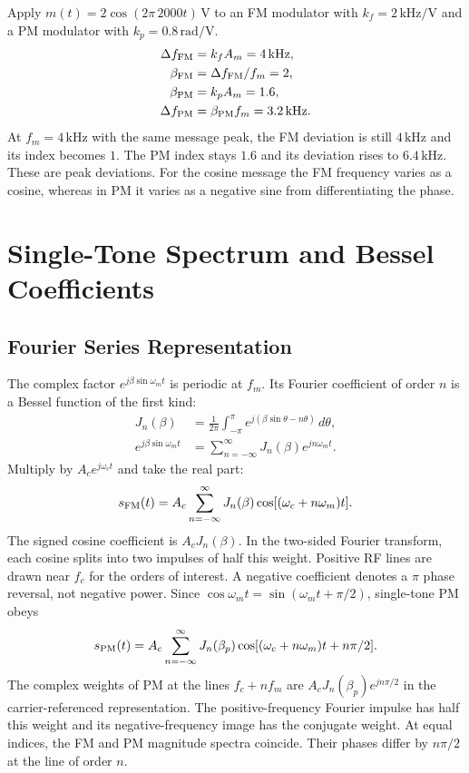 \documentclass[12pt,a4paper]{article}
\begin{document}
\begin{tcolorbox}[examplebox, title={Compare FM and PM When the Message Frequency Doubles}]
Apply $m(t)=2\cos(2\pi\,2000t)\,\mathrm V$ to an FM modulator with $k_f=2\,\mathrm{kHz/V}$ and a PM modulator with $k_p=0.8\,\mathrm{rad/V}$.
\[
\begin{aligned}
 \Delta f_{\rm FM} &= k_f A_m=4\,\mathrm{kHz},\\
 \beta_{\rm FM}&=\Delta f_{\rm FM}/f_m=2,\\
 \beta_{\rm PM}&=k_pA_m=1.6,\\
 \Delta f_{\rm PM} &=\beta_{\rm PM}f_m=3.2\,\mathrm{kHz}.
\end{aligned}
\]
At $f_m=4\,\mathrm{kHz}$ with the same message peak, the FM deviation is still $4\,\mathrm{kHz}$ and its index becomes $1$. The PM index stays $1.6$ and its deviation rises to $6.4\,\mathrm{kHz}$. These are peak deviations. For the cosine message the FM frequency varies as a cosine, whereas in PM it varies as a negative sine from differentiating the phase.
\end{tcolorbox}

\section{Single-Tone Spectrum and Bessel Coefficients}
\subsection{Fourier Series Representation}
The complex factor $e^{j\beta\sin\omega_mt}$ is periodic at $f_m$. Its Fourier coefficient of order $n$ is a Bessel function of the first kind:
\[
\begin{aligned}
 J_n(\beta)&=\frac{1}{2\pi}\int_{-\pi}^{\pi}
            e^{j(\beta\sin\theta-n\theta)}\,d\theta,\\
 e^{j\beta\sin\omega_mt}&=\sum_{n=-\infty}^{\infty}
            J_n(\beta)e^{jn\omega_mt}.
\end{aligned}
\]
Multiply by $A_ce^{j\omega_ct}$ and take the real part:
\[
 s_{\rm FM}(t)=A_c\sum_{n=-\infty}^{\infty}
          J_n(\beta)\cos[(\omega_c+n\omega_m)t].
\]
The signed cosine coefficient is $A_cJ_n(\beta)$. In the two-sided Fourier transform, each cosine splits into two impulses of half this weight. Positive RF lines are drawn near $f_c$ for the orders of interest. A negative coefficient denotes a $\pi$ phase reversal, not negative power. Since $\cos\omega_mt=\sin(\omega_mt+\pi/2)$, single-tone PM obeys
\[
 s_{\rm PM}(t)=A_c\sum_{n=-\infty}^{\infty}
 J_n(\beta_p)\cos[(\omega_c+n\omega_m)t+n\pi/2].
\]
The complex weights of PM at the lines $f_c+nf_m$ are $A_cJ_n(\beta_p)e^{jn\pi/2}$ in the carrier-referenced representation. The positive-frequency Fourier impulse has half this weight and its negative-frequency image has the conjugate weight. At equal indices, the FM and PM magnitude spectra coincide. Their phases differ by $n\pi/2$ at the line of order $n$.
\end{document}

